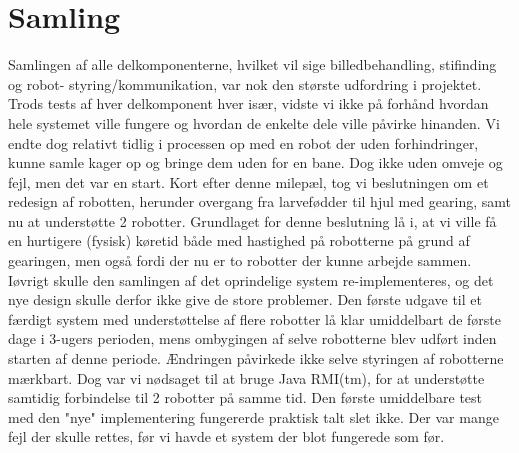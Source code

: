 \chapter{Samling}
Samlingen af alle delkomponenterne, hvilket vil sige billedbehandling, stifinding og robot- styring/kommunikation, var nok den største udfordring i projektet. Trods tests af hver delkomponent hver især, vidste vi ikke på forhånd hvordan hele systemet ville fungere og hvordan de enkelte dele ville påvirke hinanden. Vi endte dog relativt tidlig i processen op med en robot der uden forhindringer, kunne samle kager op og bringe dem uden for en bane. Dog ikke uden omveje og fejl, men det var en start.
Kort efter denne milepæl, tog vi beslutningen om et redesign af robotten, herunder overgang fra larvefødder til hjul med gearing, samt nu at understøtte 2 robotter. Grundlaget for denne beslutning lå i, at vi ville få en hurtigere (fysisk) køretid både med hastighed på robotterne på grund af gearingen, men også fordi der nu er to robotter der kunne arbejde sammen. Iøvrigt skulle den samlingen af det oprindelige system re-implementeres, og det nye design skulle derfor ikke give de store problemer.
Den første udgave til et færdigt system med understøttelse af flere robotter lå klar umiddelbart de første dage i 3-ugers perioden, mens ombygingen af selve robotterne blev udført inden starten af denne periode. Ændringen påvirkede ikke selve styringen af robotterne mærkbart. Dog var vi nødsaget til at bruge Java RMI(tm), for at understøtte samtidig forbindelse til 2 robotter på samme tid.
Den første umiddelbare test med den "nye" implementering fungererde praktisk talt slet ikke. Der var mange fejl der skulle rettes, før vi havde et system der blot fungerede som før.

